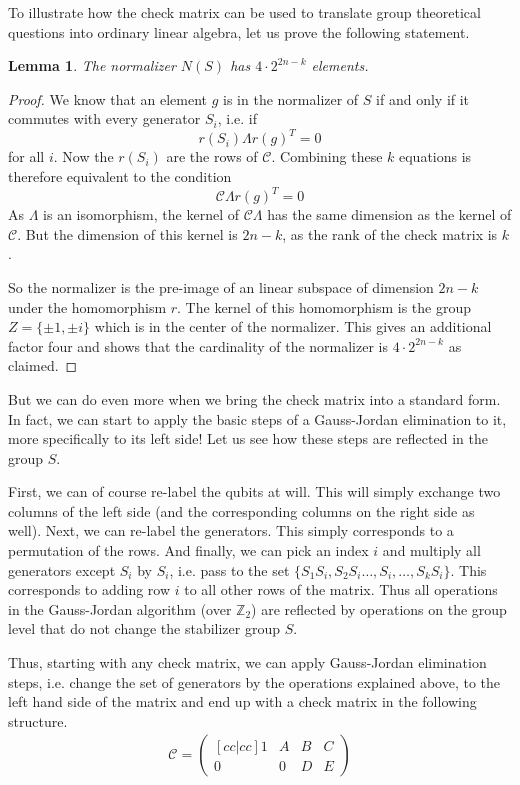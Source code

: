 \documentclass[a4paper, draft]{article}
\theoremstyle{own}
\newtheorem{lem}[thm]{Lemma}
\theoremstyle{remark}
\newcommand{\Z}{\mathbb{Z}}
\begin{document}
To illustrate how the check matrix can be used to translate group theoretical questions into ordinary linear algebra, let us prove the following statement.

\begin{lem}
The normalizer $N(S)$ has $4 \cdot 2^{2n-k}$ elements. 
\end{lem} 

\begin{proof}
We know that an element $g$ is in the normalizer of $S$ if and only if it commutes with every generator $S_i$, i.e. if
$$
r(S_i) \Lambda r(g)^T = 0
$$
for all $i$. Now the $r(S_i)$ are the rows of $\mathcal{C}$. Combining these $k$ equations is therefore equivalent to the condition
$$
\mathcal{C} \Lambda r(g)^T = 0
$$
As $\Lambda$ is an isomorphism, the kernel of $\mathcal{C} \Lambda$ has the same dimension as the kernel of $\mathcal{C}$. But the dimension of this kernel is $2n-k$, as the rank of the check matrix is $k$. 

So the normalizer is the pre-image of an linear subspace of dimension $2n-k$ under the homomorphism $r$. The kernel of this homomorphism is the group $Z = \{ \pm 1, \pm i  \}$
which is in the center of the normalizer. This gives an additional factor four and shows that the cardinality of the normalizer is $4 \cdot 2^{2n - k }$ as claimed.
\end{proof}

But we can do even more when we bring the check matrix into a standard form. In fact, we can start to apply the basic steps of a Gauss-Jordan elimination to it, more specifically to its left side! Let us see how these steps are reflected in the group $S$.

First, we can of course re-label the qubits at will. This will simply exchange two columns of the left side (and the corresponding columns on the right side as well). Next, we can re-label the generators. This simply corresponds to a permutation of the rows. And finally, we can pick an index $i$ and multiply all generators except $S_i$ by $S_i$, i.e. pass to the set $\{ S_1 S_i, S_2 S_i \dots, S_i , \dots, S_k S_i\}$. This corresponds to adding row $i$ to all other rows of the matrix. Thus all operations in the Gauss-Jordan algorithm (over $\Z_2$) are reflected by operations on the group level that do not change the stabilizer group $S$. 

Thus, starting with any check matrix, we can apply Gauss-Jordan elimination steps, i.e. change the set of generators by the operations explained above, to the left hand side of the matrix and end up with a check matrix in the following structure.
\begin{align}\label{eq:checkmatrixstandard}
\mathcal{C} = 
\begin{pmatrix}[cc|cc]
1 & A & B & C \\
0 & 0 & D & E
\end{pmatrix}
\end{align}
\end{document}
